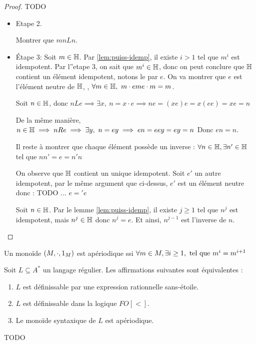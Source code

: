 \begin{proof}
	TODO

	\begin{itemize}
		\item Etape 2.

		      \begin{exercice}
			      Montrer que $mn L n$.
		      \end{exercice}
		\item Étape 3: Soit $m \in \mathbb{H}$. Par \ref{lem:puiss-idemp}, il existe $i > 1$ tel que $m^i$ est idempotent.
		      Par l''etape 3, on sait que $m^i \in \mathbb{H}$, donc on peut conclure que $\mathbb{H}$ contient un élément idempotent, notons le par
		      $e$. On va montrer que $e$ est l'élément neutre de $\mathbb{H}$, \cad, $\forall m \in \mathbb{H}, \ m\cdot e m  e \cdot m = m$.

		      Soit $n \in \mathbb{H}$, donc $n L e \implies \exists x, \ n = x\cdot e
			      \implies n e = (x e) e =  x (ee) =  x e = n$

		      De la même manière, $n \in \mathbb{H} \implies n R e \implies \exists y, \ n = ey \implies en = eey = ey = n$
		      Donc $e n = n$.

		      Il reste à montrer que chaque élément possède un inverse : $\forall n \in \mathbb{H}, \exists n' \in \mathbb{H}$ tel que $n n' = e = n'n$

		      On observe que $\mathbb{H}$ contient un unique idempotent. Soit $e'$ un autre idempotent, par le même argument
		      que ci-dessus, $e'$ est un élément neutre donc : TODO ... $e = 'e$

		      Soit $n \in \mathbb{H}$. Par le lemme \ref{lem:puiss-idemp}, il existe $j \geq 1$ tel que $n^j$ est idempotent, mais $n^j \in \mathbb{H}$ donc $n^j = e$. Et ainsi,
		      $n^{j-1}$ est l'inverse de $n$.
	\end{itemize}
\end{proof}

\begin{definition}
	Un monoïde $(M, \cdot, 1_M)$ est apériodique ssi $\forall m \in M, \exists i \geq 1, \text { tel que } m^i = m^{i+1}$
\end{definition}


\begin{theorem}[Schützenberger]
	Soit $L\subseteq A^*$ un langage régulier. Les affirmations suivantes sont équivalentes :
	\begin{enumerate}
		\item $L$ est définissable par une expression rationnelle sans-étoile.
		\item $L$ est définissable dans la logique $FO[<]$.
		\item Le monoïde syntaxique de $L$ est apériodique.
	\end{enumerate}
\end{theorem}

TODO
